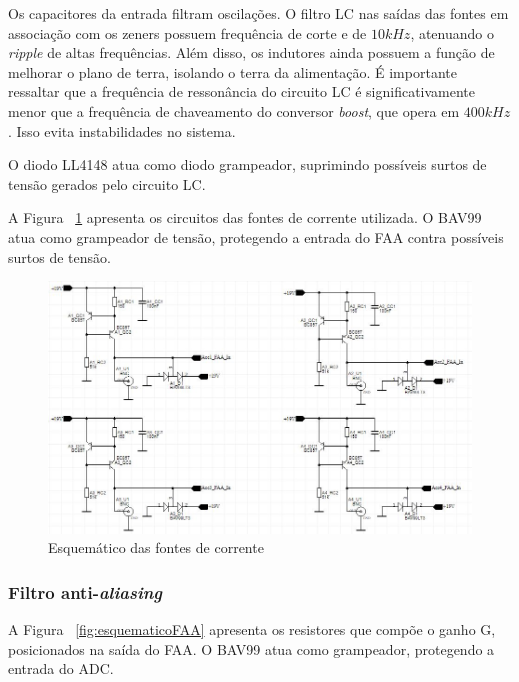 \documentclass[
	12pt,				%
	openright,			%
	twoside,			%
	a4paper,			%
	english,			%
	french,				%
	spanish,			%
	brazil,				%
	]{abntex2}
\begin{document}
				Os capacitores da entrada filtram oscilações. O filtro LC
				nas saídas das fontes em associação com os zeners possuem
				frequência de corte e de $10kHz$, atenuando o
				\textit{ripple} de altas frequências. Além disso, os
				indutores ainda possuem a função de melhorar o plano de
				terra, isolando o terra da alimentação. É importante
				ressaltar que a frequência de ressonância do circuito LC é
				significativamente menor que a frequência de chaveamento do
				conversor \textit{boost}, que opera em $400kHz$. Isso evita
				instabilidades no sistema.

				O diodo LL4148 atua como diodo grampeador, suprimindo
				possíveis surtos de tensão gerados pelo circuito LC.

				A Figura ~\ref{fig:esquematicoFontesCorrente} apresenta os circuitos das fontes de corrente
				utilizada. O BAV99 atua como grampeador de tensão,
				protegendo a entrada do FAA contra possíveis surtos de
				tensão.

				\begin{figure}[!ht]
					\centering
					\includegraphics[width=\linewidth]{../Fotos/fonteCorrenteEsquematico.jpg}
					\caption{Esquemático das fontes de corrente}
					\label{fig:esquematicoFontesCorrente}
				\end{figure}				

			\subsubsection{Filtro anti-\textit{aliasing}}

				A Figura ~\ref{fig:esquematicoFAA} apresenta os resistores que compõe o ganho G,
				posicionados na saída do FAA. O BAV99 atua como grampeador,
				protegendo a entrada do ADC.
\end{document}
